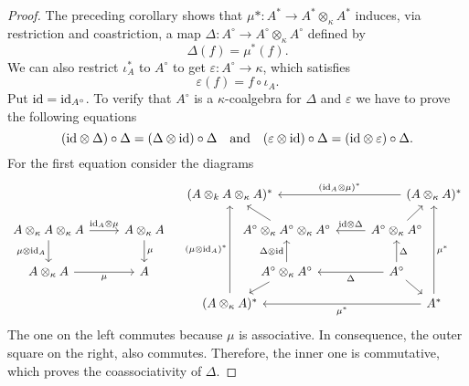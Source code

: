 \begin{proof}
    The preceding corollary shows that $\mu*\colon A^*\to A^*\otimes_\kappa A^*$ induces, via restriction and coastriction, a map $\Delta\colon A^\circ\to A^\circ\otimes_\kappa A^\circ$ defined by
    $$
        \Delta(f) = \mu^*(f).
    $$
    We can also restrict $\iota_A^*$ to $A^\circ$ to get $\varepsilon\colon A^\circ\to\kappa$, which satisfies
    $$
        \varepsilon(f)=f\circ\iota_A.
    $$
    Put $\text{\rm id}=\text{\rm id}_{A^\circ}$. To verify that $A^\circ$ is a $\kappa$-coalgebra for $\Delta$ and $\varepsilon$ we have to prove the following equations
    $$
        (\text{\rm id}\otimes\Delta)\circ\Delta
            = (\Delta\otimes\text{\rm id})\circ\Delta
        \quad\text{and}\quad
        (\varepsilon\otimes\text{\rm id})\circ\Delta
            = (\text{\rm id}\otimes\varepsilon)\circ\Delta.
    $$
    For the first equation consider the diagrams
    \small
    $$
        \begin{tikzcd}
                &&[-0.5cm]&[-2cm]&&[-1.6cm]\\[-0.5cm]
                &&(A\otimes_kA\otimes_\kappa A)^*
                &&&(A\otimes_\kappa A)^*
                    \arrow[lll,"(\id_A\otimes\mu)^*"']\\[-0.2cm]
            A\otimes_\kappa A\otimes_\kappa A
                    \arrow[d,"\mu\otimes\id_A"']
                    \arrow[r,"\id_A\otimes\mu"]
                &A\otimes_\kappa A
                    \arrow[d,"\mu"]
                &&A^\circ\otimes_\kappa A^\circ\otimes_\kappa A^\circ
                    \arrow[lu]
                &A^\circ\otimes_\kappa A^\circ
                    \arrow[ru]
                    \arrow[l,"\id\otimes\Delta"']\\
            A\otimes_\kappa A
                    \arrow[r,"\mu"']
                &A
                &&A^\circ\otimes_\kappa A^\circ
                    \arrow[ld]
                    \arrow[u,"\Delta\otimes\id"]
                &A^\circ\arrow[rd]
                    \arrow[l,"\Delta"]
                    \arrow[u,"\Delta"']\\[-0.3cm]
                &&(A\otimes_\kappa A)^*
                    \arrow[uuu,"(\mu\otimes\id_A)^*"]
                &&&A^*
                    \arrow[uuu,"\mu^*"']
                    \arrow[lll,"\mu^*"]
        \end{tikzcd}
    $$
    \normalsize
    The one on the left commutes because $\mu$ is associative. In consequence, the outer square on the right, also commutes. Therefore, the inner one is commutative, which proves the coassociativity of $\Delta$.


\end{proof}
